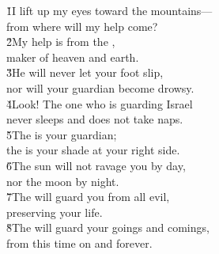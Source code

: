 \begin{poetry}
\poeml \v{1}I lift up my eyes toward the mountains--- \\
\poemll    from where will my help come? \\
\poeml \v{2}My help is from the , \\
\poemll    maker of heaven and earth. \\
\poeml \v{3}He will never let your foot slip, \\
\poemll    nor will your guardian become drowsy. \\
\poeml \v{4}Look! The one who is guarding Israel \\
\poemll    never sleeps and does not take naps. \\
\poeml \v{5}The  is your guardian; \\
\poemll    the  is your shade at your right side. \\
\poeml \v{6}The sun will not ravage you by day, \\
\poemll    nor the moon by night. \\
\poeml \v{7}The  will guard you from all evil, \\
\poemll    preserving your life. \\
\poeml \v{8}The  will guard your goings and comings, \\
\poemll    from this time on and forever.
\end{poetry}

